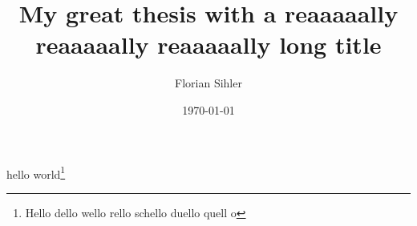 \documentclass[
	verbose,
	english,
	paper=a4,  %
]{thesis}
\title{My great thesis with a reaaaaally reaaaaally reaaaaally long title}
\author{Florian Sihler}
\date{\today}
\begin{document}
	\maketitle

	hello world\footnote{\the\marginparwidth Hello dello wello rello schello duello quell o} %
	\blindtext

	\tableofcontents

	\Blinddocument
\end{document}
